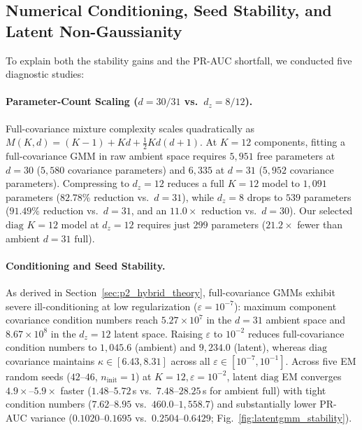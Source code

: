 \subsection{Numerical Conditioning, Seed Stability, and Latent Non-Gaussianity}
\label{subsec:latentgmm_diagnostics}

To explain both the stability gains and the PR-AUC shortfall, we conducted five diagnostic studies:

\paragraph{Parameter-Count Scaling ($d=30/31$ vs.\ $d_z=8/12$).}
Full-covariance mixture complexity scales quadratically as $M(K,d) = (K-1) + K d + \frac{1}{2} K d(d+1)$. At $K=12$ components, fitting a $\mathrm{full}$-covariance GMM in raw ambient space requires $5{,}951$ free parameters at $d=30$ ($5{,}580$ covariance parameters) and $6{,}335$ at $d=31$ ($5{,}952$ covariance parameters). Compressing to $d_z=12$ reduces a $\mathrm{full}$ $K=12$ model to $1{,}091$ parameters ($82.78\%$ reduction vs.\ $d=31$), while $d_z=8$ drops to $539$ parameters ($91.49\%$ reduction vs.\ $d=31$, and an $11.0\times$ reduction vs.\ $d=30$). Our selected $\mathrm{diag}$ $K=12$ model at $d_z=12$ requires just $299$ parameters ($21.2\times$ fewer than ambient $d=31$ $\mathrm{full}$).

\paragraph{Conditioning and Seed Stability.}
As derived in Section~\ref{sec:p2_hybrid_theory}, full-covariance GMMs exhibit severe ill-conditioning at low regularization ($\varepsilon = 10^{-7}$): maximum component covariance condition numbers reach $5.27 \times 10^7$ in the $d=31$ ambient space and $8.67 \times 10^8$ in the $d_z=12$ latent space. Raising $\varepsilon$ to $10^{-2}$ reduces $\mathrm{full}$-covariance condition numbers to $1{,}045.6$ (ambient) and $9{,}234.0$ (latent), whereas $\mathrm{diag}$ covariance maintains $\kappa \in [6.43, 8.31]$ across all $\varepsilon \in [10^{-7}, 10^{-1}]$. Across five EM random seeds ($42$--$46$, $n_{\mathrm{init}}=1$) at $K=12, \varepsilon=10^{-2}$, latent $\mathrm{diag}$ EM converges $4.9\times$--$5.9\times$ faster ($1.48$--$5.72$\,s vs.\ $7.48$--$28.25$\,s for ambient $\mathrm{full}$) with tight condition numbers ($7.62$--$8.95$ vs.\ $460.0$--$1{,}558.7$) and substantially lower PR-AUC variance ($0.1020$--$0.1695$ vs.\ $0.2504$--$0.6429$; Fig.~\ref{fig:latentgmm_stability}).

